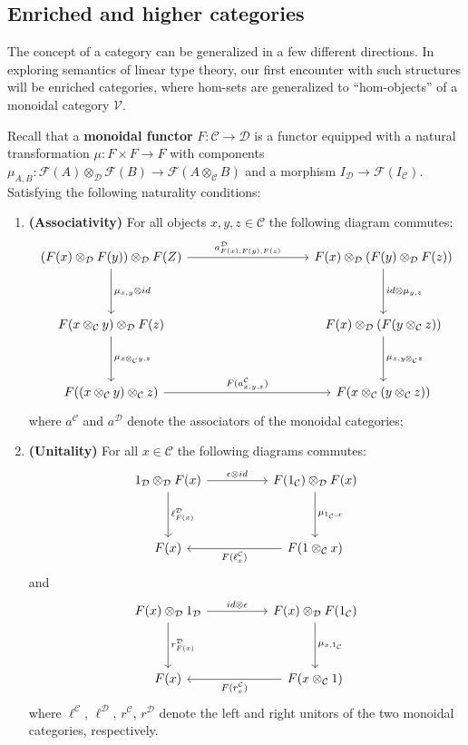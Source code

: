 \subsection{Enriched and higher categories}
The concept of a category can be generalized in a few different directions. In exploring semantics of linear type theory, our first encounter with such structures will be  enriched categories, where hom-sets are generalized to ``hom-objects'' of a monoidal category $\mathcal{V}$.
\begin{defn}Recall that a \textbf{monoidal functor} $F : \mathcal{C} \to \mathcal{D}$ is a functor equipped with a natural transformation $\mu : F \times F \to F$ with components $\mu_{A,B} : \mathcal{F}(A) \otimes_{\mathcal{D}} \mathcal{F}(B) \to \mathcal{F}(A \otimes_{\mathcal{C}} B)$ and a morphism $I_{\mathcal{D}} \to \mathcal{F}(I_{\mathcal{C}})$. Satisfying the following naturality conditions:

  
\begin{enumerate}
\item \textbf{(Associativity)} For all objects $x,y,z \in \mathcal{C}$ the following diagram commutes:
  \[
    \ti
    (F(x) \otimes_{\mathcal{D}} F(y)) \otimes_{\mathcal{D}} F(Z)
    \ar[rr,"{a^{\mathcal{D}}_{F(x),F(y),F(z)}}"]
    \ar[d, "{\mu_{x,y} \otimes id}"] & &
    F(x) \otimes_{\mathcal{D}}( F(y)\otimes_{\mathcal{D}} F(z) )
    \ar[d, "{id\otimes \mu_{y,z}}"]\\
    F(x \otimes_{\mathcal{C}} y) \otimes_{\mathcal{D}} F(z)
    \ar[d, "{\mu_{x \otimes_{\mathcal{C}} y , z} }"]
     &&
     F(x) \otimes_{\mathcal{D}} ( F(y \otimes_{\mathcal{C}} z) )
     \ar[d, "\mu_{ x, y \otimes_{\mathcal{C}} z  }"]
     \\
     F( ( x \otimes_{\mathcal{C}} y ) \otimes_{\mathcal{C}} z  )
     \ar[rr, "F(a^{\mathcal{C}}_{x,y,z})"]&&
    F( x \otimes_{\mathcal{C}} ( y \otimes_{\mathcal{C}} z ) )
    \kz
\]
where $a^{\mathcal{C}}$ and $a^{\mathcal{D}}$ denote the associators of the monoidal categories;
\item \textbf{(Unitality)} For all $x \in \mathcal{C}$ the following diagrams commutes:
  \[
    \ti
    1_{\mathcal{D}} \otimes_{\mathcal{D}} F(x)
    \ar[r, "\epsilon \otimes id"]
    \ar[d, "\ell^{\mathcal{D}}_{F(x)}"]
      &
      F(1_{\mathcal{C}}) \otimes_{\mathcal{D}} F(x)
      \ar[d, "\mu_{1_{\mathcal{C}}, x }"]
      \\
      F(x) &
      \ar[l, "F(\ell^{\mathcal{C}}_x)"]
      F( 1 \otimes_{\mathcal{C}} x)
      \kz
\]
and
  \[
    \ti
     F(x) \otimes_{\mathcal{D}} 1_{\mathcal{D}} 
    \ar[r, "id \otimes \epsilon"]
    \ar[d, "r^{\mathcal{D}}_{F(x)}"]
      &
      F(x) \otimes_{\mathcal{D}}F(1_{\mathcal{C}}) 
      \ar[d, "\mu_{x, 1_{\mathcal{C}}}"]
      \\
      F(x) &
      \ar[l, "F(r^{\mathcal{C}}_x)"]
      F( x \otimes_{\mathcal{C}} 1)
      \kz
\]
where $\ell^{\mathcal{C}}$, $\ell^{\mathcal{D}}$, $r^{\mathcal{C}}$, $r^{\mathcal{D}}$ denote the left and right unitors of the two monoidal categories, respectively.
\end{enumerate}
\end{defn}
